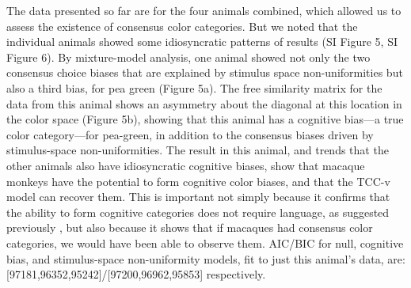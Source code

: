 \documentclass[9pt,biorxiv,lineno,onehalfspacing]{lapreprint}
\begin{document}
\begin{refsection}
The data presented so far are for the four animals combined, which allowed us to assess the existence of consensus color categories. 
But we noted that the individual animals showed some idiosyncratic patterns of results (SI Figure 5, SI Figure 6). 
By mixture-model analysis, one animal showed not only the two consensus choice biases that are explained by stimulus space non-uniformities but also a third bias, for pea green (Figure 5a). 
The free similarity matrix for the data from this animal shows an asymmetry about the diagonal at this location in the color space (Figure 5b), showing that this animal has a cognitive bias---a true color category---for pea-green, in addition to the consensus biases driven by stimulus-space non-uniformities. 
The result in this animal, and trends that the other animals also have idiosyncratic cognitive biases, show that macaque monkeys have the potential to form cognitive color biases, and that the TCC-v model can recover them. 
This is important not simply because it confirms that the ability to form cognitive categories does not require language, as suggested previously \citep{panichello_error-correcting_2019}, but also because it shows that if macaques had consensus color categories, we would have been able to observe them.
AIC/BIC for null, cognitive bias, and stimulus-space non-uniformity models, fit to just this animal's data, are: [97181,96352,95242]/[97200,96962,95853] respectively.



\end{refsection}
\end{document}
